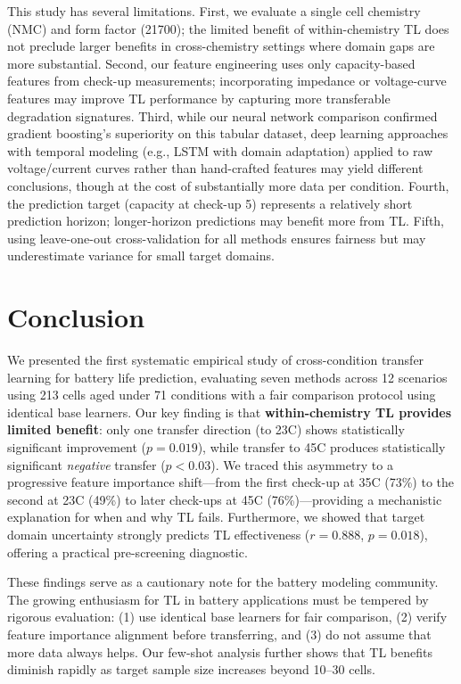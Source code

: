 \documentclass[review]{elsarticle}
\begin{document}
This study has several limitations. First, we evaluate a single cell chemistry (NMC) and form factor (21700); the limited benefit of within-chemistry TL does not preclude larger benefits in cross-chemistry settings where domain gaps are more substantial. Second, our feature engineering uses only capacity-based features from check-up measurements; incorporating impedance or voltage-curve features may improve TL performance by capturing more transferable degradation signatures. Third, while our neural network comparison confirmed gradient boosting's superiority on this tabular dataset, deep learning approaches with temporal modeling (e.g., LSTM with domain adaptation) applied to raw voltage/current curves rather than hand-crafted features may yield different conclusions, though at the cost of substantially more data per condition. Fourth, the prediction target (capacity at check-up 5) represents a relatively short prediction horizon; longer-horizon predictions may benefit more from TL. Fifth, using leave-one-out cross-validation for all methods ensures fairness but may underestimate variance for small target domains.

\section{Conclusion}
\label{sec:conclusion}

We presented the first systematic empirical study of cross-condition transfer learning for battery life prediction, evaluating seven methods across 12 scenarios using 213 cells aged under 71 conditions with a fair comparison protocol using identical base learners. Our key finding is that \textbf{within-chemistry TL provides limited benefit}: only one transfer direction (to 23\textdegree C) shows statistically significant improvement ($p = 0.019$), while transfer to 45\textdegree C produces statistically significant \textit{negative} transfer ($p < 0.03$). We traced this asymmetry to a progressive feature importance shift---from the first check-up at 35\textdegree C (73\%) to the second at 23\textdegree C (49\%) to later check-ups at 45\textdegree C (76\%)---providing a mechanistic explanation for when and why TL fails. Furthermore, we showed that target domain uncertainty strongly predicts TL effectiveness ($r = 0.888$, $p = 0.018$), offering a practical pre-screening diagnostic.

These findings serve as a cautionary note for the battery modeling community. The growing enthusiasm for TL in battery applications must be tempered by rigorous evaluation: (1) use identical base learners for fair comparison, (2) verify feature importance alignment before transferring, and (3) do not assume that more data always helps. Our few-shot analysis further shows that TL benefits diminish rapidly as target sample size increases beyond 10--30 cells.
\end{document}
